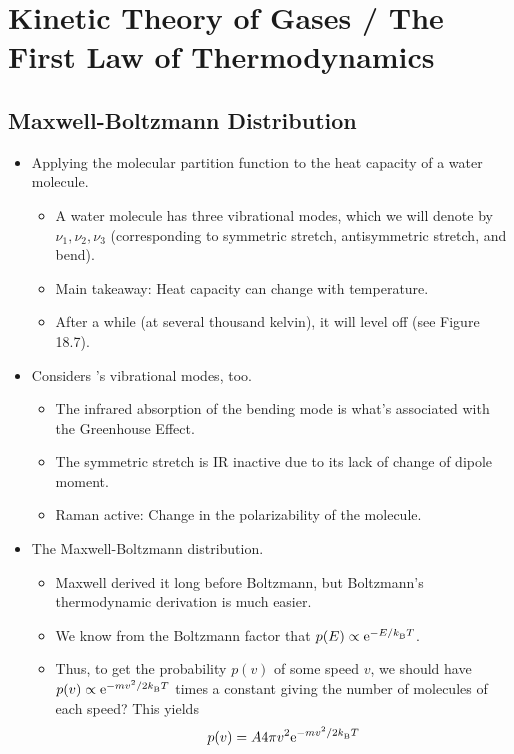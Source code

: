 \documentclass[../notes.tex]{subfiles}
\begin{document}
\chapter{Kinetic Theory of Gases / The First Law of Thermodynamics}
\section{Maxwell-Boltzmann Distribution}
\begin{itemize}
    \item {}Applying the molecular partition function to the heat capacity of a water molecule.
    \begin{itemize}
        \item A water molecule has three vibrational modes, which we will denote by $\nu_1,\nu_2,\nu_3$ (corresponding to symmetric stretch, antisymmetric stretch, and bend).
        \item Main takeaway: Heat capacity can change with temperature.
        \item After a while (at several thousand kelvin), it will level off (see Figure 18.7).
    \end{itemize}
    \item Considers 's vibrational modes, too.
    \begin{itemize}
        \item The infrared absorption of the bending mode is what's associated with the Greenhouse Effect.
        \item The symmetric stretch is IR inactive due to its lack of change of dipole moment.
        \item Raman active: Change in the polarizability of the molecule.
    \end{itemize}
    \item The Maxwell-Boltzmann distribution.
    \begin{itemize}
        \item Maxwell derived it long before Boltzmann, but Boltzmann's thermodynamic derivation is much easier.
        \item We know from the Boltzmann factor that $p(E)\propto\e[-E/\kB T]$.
        \item Thus, to get the probability $p(v)$ of some speed $v$, we should have $p(v)\propto\e[-mv^2/2\kB T]$ times a constant giving the number of molecules of each speed? This yields
        \begin{equation*}
            p(v) = A4\pi v^2\e[-mv^2/2\kB T]
        \end{equation*}

\end{itemize}
\end{itemize}
\end{document}
